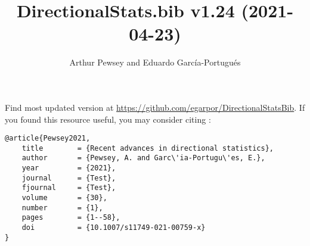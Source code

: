 \documentclass[10pt]{article}
\title{DirectionalStats.bib v1.24 (2021-04-23)}
\author{Arthur Pewsey and Eduardo García-Portugués}
\date{}
\begin{document}
\maketitle

Find most updated version at \url{https://github.com/egarpor/DirectionalStatsBib}. If you found this resource useful, you may consider citing \cite{Pewsey2021}:
\begin{verbatim}
@article{Pewsey2021,
    title        = {Recent advances in directional statistics},
    author       = {Pewsey, A. and Garc\'ia-Portugu\'es, E.},
    year         = {2021},
    journal      = {Test},
    fjournal     = {Test},
    volume       = {30},
    number       = {1},
    pages        = {1--58},
    doi          = {10.1007/s11749-021-00759-x}
}
\end{verbatim}

\nocite{*}

\setlength\bibsep{0cm}
\setlength\bibhang{0.25cm}



\end{document}

